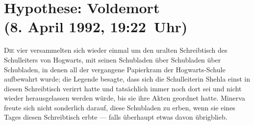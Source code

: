 \begin{headlines}





\end{headlines}

\section{Hypothese: Voldemort\\
(8. April 1992, 19:22~Uhr)}

\lettrine{D}{ie} vier versammelten sich wieder einmal um den uralten Schreibtisch des Schulleiters von Hogwarts, mit seinen Schubladen über Schubladen über Schubladen, in denen all der vergangene Papierkram der Hogwarts-Schule aufbewahrt wurde; die Legende besagte, dass sich die Schulleiterin Shehla einst in diesen Schreibtisch verirrt hatte und tatsächlich immer noch dort sei und nicht wieder herausgelassen werden würde, bis sie ihre Akten geordnet hatte. Minerva freute sich nicht sonderlich darauf, diese Schubladen zu erben, wenn sie eines Tages diesen Schreibtisch erbte — falls überhaupt etwas davon übrigblieb.

